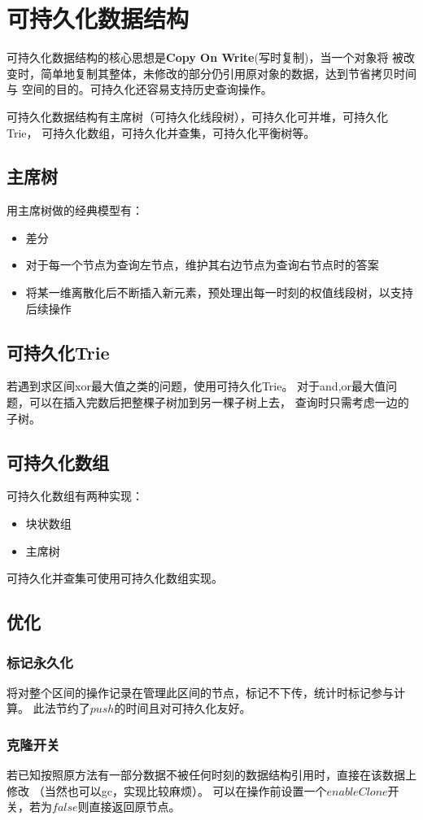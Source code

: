 \section{可持久化数据结构}
可持久化数据结构的核心思想是{\bfseries Copy On Write}(写时复制)，当一个对象将
被改变时，简单地复制其整体，未修改的部分仍引用原对象的数据，达到节省拷贝时间与
空间的目的。可持久化还容易支持历史查询操作。

可持久化数据结构有主席树（可持久化线段树），可持久化可并堆，可持久化Trie，
可持久化数组，可持久化并查集，可持久化平衡树等。
\subsection{主席树}
用主席树做的经典模型有：
\begin{itemize}
    \item 差分
    \item 对于每一个节点为查询左节点，维护其右边节点为查询右节点时的答案
    \item 将某一维离散化后不断插入新元素，预处理出每一时刻的权值线段树，以支持后续操作
\end{itemize}
\subsection{可持久化Trie}
若遇到求区间xor最大值之类的问题，使用可持久化Trie。
对于and,or最大值问题，可以在插入完数后把整棵子树加到另一棵子树上去，
查询时只需考虑一边的子树。
\subsection{可持久化数组}
可持久化数组有两种实现：
\begin{itemize}
    \item 块状数组
    \item 主席树
\end{itemize}
可持久化并查集可使用可持久化数组实现。
\subsection{优化}
\subsubsection{标记永久化}
将对整个区间的操作记录在管理此区间的节点，标记不下传，统计时标记参与计算。
此法节约了$push$的时间且对可持久化友好。
\subsubsection{克隆开关}
若已知按照原方法有一部分数据不被任何时刻的数据结构引用时，直接在该数据上修改
（当然也可以gc，实现比较麻烦）。
可以在操作前设置一个$enableClone$开关，若为$false$则直接返回原节点。

